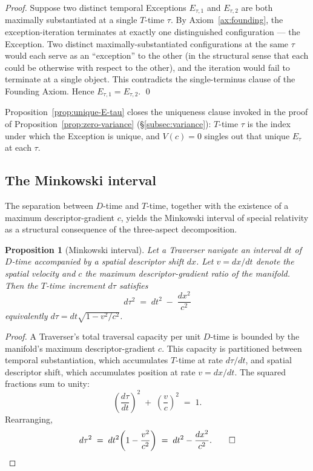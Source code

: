 \documentclass[11pt,a4paper]{article}
\newtheorem{proposition}[theorem]{Proposition}
\theoremstyle{definition}
\theoremstyle{remark}
\begin{document}
\begin{proof}
Suppose two distinct temporal Exceptions $E_{\tau,1}$ and $E_{\tau,2}$ are both maximally substantiated at a single $T$-time $\tau$. By Axiom~\ref{ax:founding}, the exception-iteration terminates at exactly one distinguished configuration --- the Exception. Two distinct maximally-substantiated configurations at the same $\tau$ would each serve as an ``exception'' to the other (in the structural sense that each could be otherwise with respect to the other), and the iteration would fail to terminate at a single object. This contradicts the single-terminus clause of the Founding Axiom. Hence $E_{\tau,1} = E_{\tau,2}$. \qed
\end{proof}

Proposition~\ref{prop:unique-E-tau} closes the uniqueness clause invoked in the proof of Proposition~\ref{prop:zero-variance} (\S\ref{subsec:variance}): $T$-time $\tau$ is the index under which the Exception is unique, and $V(c) = 0$ singles out that unique $E_{\tau}$ at each $\tau$.

\subsection{The Minkowski interval}\label{subsec:minkowski}

The separation between $D$-time and $T$-time, together with the existence of a maximum descriptor-gradient $c$, yields the Minkowski interval of special relativity as a structural consequence of the three-aspect decomposition.

\begin{proposition}[Minkowski interval]\label{prop:minkowski}
Let a Traverser navigate an interval $dt$ of $D$-time accompanied by a spatial descriptor shift $dx$. Let $v = dx/dt$ denote the spatial velocity and $c$ the maximum descriptor-gradient ratio of the manifold. Then the $T$-time increment $d\tau$ satisfies
\[
\boxed{\;d\tau^{2} \;=\; dt^{2} \;-\; \frac{dx^{2}}{c^{2}}\;}
\]
equivalently $d\tau = dt\sqrt{1 - v^{2}/c^{2}}$.
\end{proposition}

\begin{proof}
A Traverser's total traversal capacity per unit $D$-time is bounded by the manifold's maximum descriptor-gradient $c$. This capacity is partitioned between temporal substantiation, which accumulates $T$-time at rate $d\tau/dt$, and spatial descriptor shift, which accumulates position at rate $v = dx/dt$. The squared fractions sum to unity:
\[
\left(\frac{d\tau}{dt}\right)^{\!2} \;+\; \left(\frac{v}{c}\right)^{\!2} \;=\; 1.
\]
Rearranging,
\[
d\tau^{2} \;=\; dt^{2}\!\left(1 - \frac{v^{2}}{c^{2}}\right) \;=\; dt^{2} - \frac{dx^{2}}{c^{2}}. \qed
\]
\end{proof}
\end{document}
